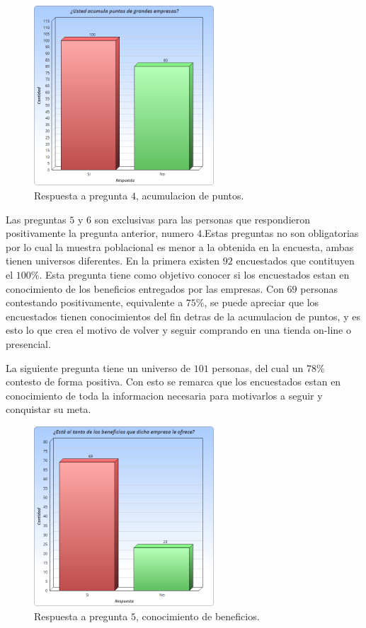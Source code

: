 \begin{figure}[!htb]
  \centering
  \includegraphics[width=0.6\textwidth]{images/Graficos/graf_5_2.png}
  \caption[chart5.2]{Respuesta a pregunta $4$, acumulacion de puntos.}
  \label{fig:chart5.2}
\end{figure}

Las preguntas $5$ y $6$ son exclusivas para las personas que respondieron positivamente la
pregunta anterior, numero $4$.Estas preguntas no son obligatorias por lo cual la muestra poblacional
es menor a la obtenida en la encuesta, ambas tienen universos diferentes.
En la primera existen $92$ encuestados que contituyen el $100\%$. Esta pregunta tiene como objetivo 
conocer si los encuestados estan en conocimiento de los beneficios entregados por las empresas.  
Con $69$ personas contestando positivamente, equivalente a $75\%$, se puede apreciar que los 
encuestados tienen conocimientos del fin detras de la acumulacion de puntos, y es esto lo que
crea el motivo de volver y seguir comprando en una tienda on-line o presencial.

La siguiente pregunta tiene un universo de $101$ personas, del cual un $78\%$ contesto de forma positiva.
Con esto se remarca que los encuestados estan en conocimiento de toda la informacion necesaria 
para motivarlos a seguir y conquistar su meta.

\begin{figure}[!htb]
  \centering
  \includegraphics[width=0.6\textwidth]{images/Graficos/graf_5_3.png}
  \caption[chart5.3]{Respuesta a pregunta $5$, conocimiento de beneficios.}
  \label{fig:chart5.3}
\end{figure}


